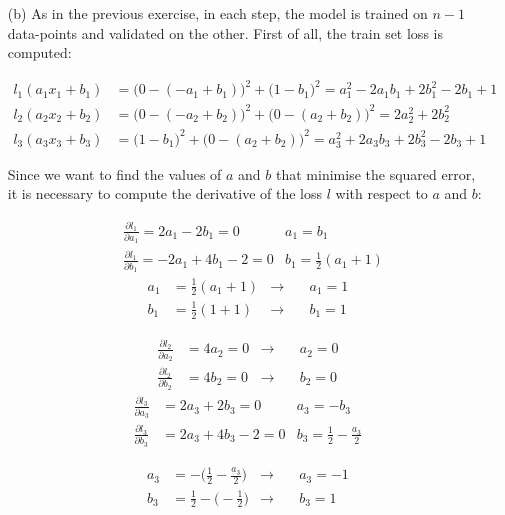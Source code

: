 {\begin{itemize}
		\item[(b)] As in the previous exercise, in each step, the model is 
		trained on $n-1$ data-points and validated on the other. First of all, 
		the train set loss is computed:
		
		\begin{align*}
		l_1(a_1x_1+b_1) & = \big(0-({-a_1+b_1})\big)^2 + 
		\big(1-b_1\big)^2  =  a_1^2 - 2 a_1 b_1 + 2 b_1^2 - 2 b_1 + 1  \\
		l_2(a_2x_2+b_2) & = \big(0-({-a_2+b_2})\big)^2 + 
		\big(0-({a_2+b_2})\big)^2 = 2 a_2^2 + 2 b_2^2 \\
		l_3(a_3x_3+b_3) & = \big(1-b_1\big)^2 + 
		\big(0-({a_2+b_2})\big)^2 = a_3^2 + 2 a_3 b_3 + 2 b_3^2 - 2 b_3 + 1
		\end{align*}
		
		Since we want to find the values of $a$ and $b$ that minimise the 
		squared error, it is necessary to compute the derivative of the loss 
		$l$ with respect to $a$ and $b$:
		
		\begin{align*}
		&\frac{\partial l_1}{\partial a_1} = 2 a_1 - 2 b_1 = 0  
		& a_1 = b_1 \\
		&\frac{\partial l_1}{\partial b_1} = -2 a_1 + 4 b_1 - 2 = 0  
		& b_1 = \frac{1}{2} (a_1 + 1)
		\end{align*}
		\begin{align*}
		a_1 &= \frac{1}{2} (a_1 + 1)  &\rightarrow &\quad a_1 = 1\\
		b_1 &= \frac{1}{2} (1 + 1)  &\rightarrow& \quad b_1 = 1
		\end{align*}
		
		\begin{align*}
		\frac{\partial l_2}{\partial a_2} & = 4 a_2 = 0  
		&\rightarrow &\quad a_2 = 0  \\
		\frac{\partial l_2}{\partial b_2} & = 4 b_2 = 0  
		&\rightarrow &\quad b_2 = 0
		\end{align*}
		\begin{align*}
		\frac{\partial l_3}{\partial a_3} & = 2a_3+2b_3= 0  
		& a_3 = -b_3 \\
		\frac{\partial l_3}{\partial b_3} & = 2 a_3 + 4 b_3 - 2 = 0  
		& b_3 = \frac{1}{2} - \frac{a_3}{2}
		\end{align*}
		
		\begin{align*}
		a_3 &= - \bigg(\frac{1}{2} - \frac{a_3}{2}\bigg) &\rightarrow &\quad 
		a_3 = -1\\
		b_3 &= \frac{1}{2} -\bigg(-\frac{1}{2}\bigg) &\rightarrow& \quad b_3 = 1
		\end{align*}
		

\end{itemize}}
